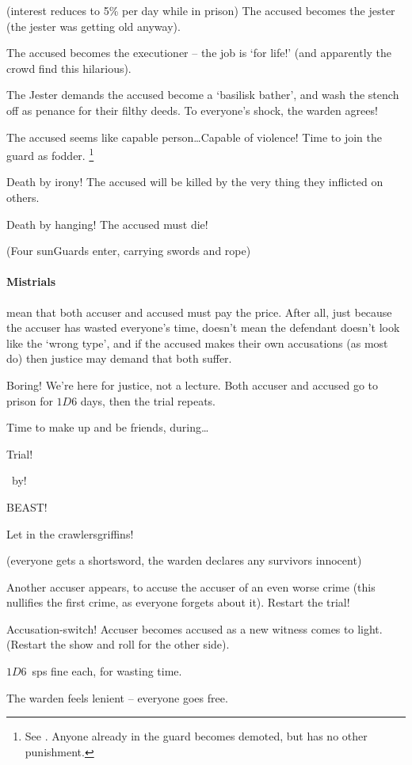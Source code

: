 \begin{multicols}{2}
\begin{dlist}
    (interest reduces to 5\% per day while in prison)
  \else
    The accused becomes the jester (the jester was getting old anyway).
  \fi
  \item
    The accused becomes the executioner -- the job is `for life!' (and apparently the crowd find this hilarious).
  \item
    The Jester demands the accused become a `\gls{basilisk} bather', and wash the stench off  as penance for their filthy deeds.
    To everyone's shock, the \gls{warden} agrees!
  \item
  The accused seems like capable person\ldots Capable of violence!
  Time to join the \gls{guard} as fodder.%
  \footnote{See . Anyone already in the \gls{guard} becomes demoted, but has no other punishment.}
  \item
  Death by irony!
  The accused will be killed by the very thing they inflicted on others.
  \item
  Death by hanging!
  The accused must die!

  (Four \glspl{sunGuard} enter, carrying swords and rope)
\end{dlist}

\paragraph{Mistrials}
mean that both accuser and accused must pay the price.
After all, just because the accuser has wasted everyone's time, doesn't mean the defendant doesn't look like the `wrong type', and if the accused makes their own accusations (as most do) then justice may demand that both suffer.

\label{mistrials}
\begin{dlist}
  \item
  Boring!
  We're here for justice, not a lecture.
  Both accuser and accused go to prison for $1D6$ days, then the trial repeats.
  \item
  Time to make up and be friends, during\ldots

  Trial!

  ~by!

  BEAST!

  Let in the \ifodd\value{r4} \glspl{crawler}\else \glspl{griffin}\fi!

  (everyone gets a shortsword, the \gls{warden} declares any survivors innocent)
  \item
  Another accuser appears, to accuse the accuser of an even worse crime (this nullifies the first crime, as everyone forgets about it).
  Restart the trial!
  \item
  Accusation-switch!
  Accuser becomes accused as a new witness comes to light.
  (Restart the show and roll for the other side).
  \item
  $1D6$~\glspl{sp} fine each, for wasting time.
  \item
  The \gls{warden} feels lenient -- everyone goes free.
\end{dlist}

\end{multicols}

\encTownEvents

